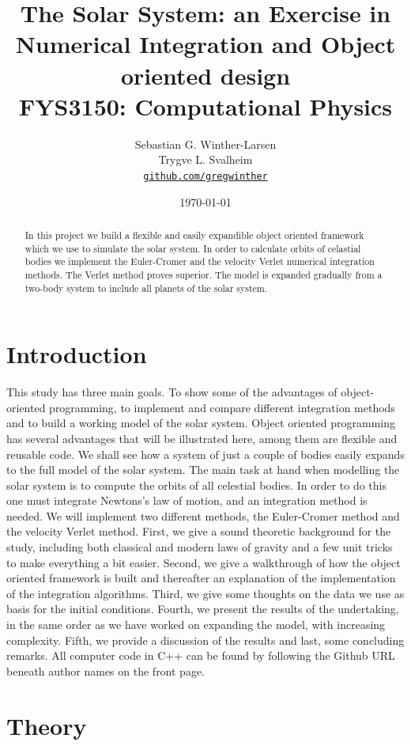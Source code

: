 \documentclass[10pt,a4paper]{amsart}
\title[Simulation of the Solar System]{The Solar System: an Exercise in Numerical Integration and Object oriented design \\
  \hrulefill\small{ FYS3150: Computational Physics }\hrulefill}
\author[Winther-Larsen \& Svalheim]{Sebastian G. Winther-Larsen \\ 
Trygve L. Svalheim \\
\href{https://github.com/gregwinther/FYS3150/}{\texttt{github.com/gregwinther}}}
\date{\today}
\begin{document}
\begin{titlepage}
\begin{abstract}
In this project we build a flexible and easily expandible object oriented framework which we use to simulate the solar system. In order to calculate orbits of celastial bodies we implement the Euler-Cromer and the velocity Verlet numerical integration methods. The Verlet method proves superior. The model is expanded gradually from a two-body system to include all planets of the solar system.
\end{abstract}
\maketitle
\tableofcontents
\end{titlepage}

\section{Introduction}

This study has three main goals. To show some of the advantages of object-oriented programming, to implement and compare different integration methods and to build a working model of the solar system. Object oriented programming has several advantages that will be illustrated here, among them are flexible and reusable code. We shall see how a system of just a couple of bodies easily expands to the full model of the solar system. The main task at hand when modelling the solar system is to compute the orbits of all celestial bodies. In order to do this one must integrate Newtons's law of motion, and an integration method is needed. We will implement two different methods, the Euler-Cromer method and the velocity Verlet method.
First, we give a sound theoretic background for the study, including both classical and modern laws of gravity and a few unit tricks to make everything a bit easier. Second, we give a walkthrough of how the object oriented framework is built and thereafter an explanation of the implementation of the integration algorithms. Third, we give some thoughts on the data we use as basis for the initial conditions. Fourth, we present the results of the undertaking, in the same order as we have worked on expanding the model, with increasing complexity. Fifth, we provide a discussion of the results and last, some concluding remarks. All computer code in C++ can be found by following the Github URL beneath author names on the front page.

\section{Theory}
\end{document}
